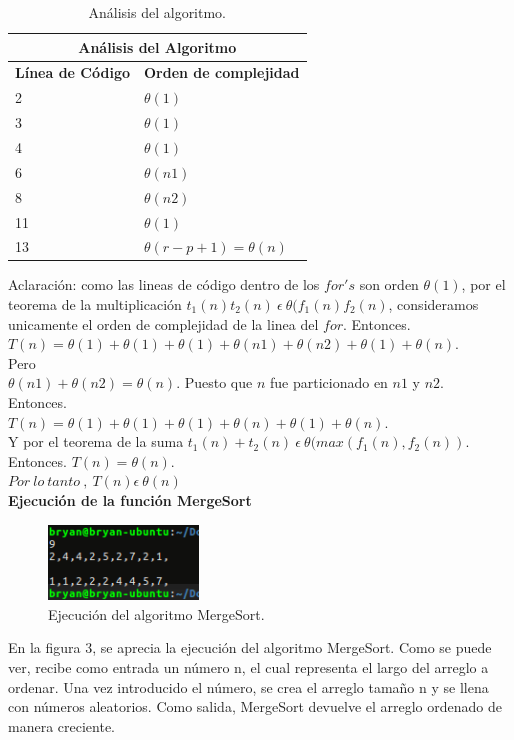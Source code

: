 \documentclass[12pt]{report}
\begin{document}
\begin{table}[htbp]
	\begin{center}
		\begin{tabular}{|l|l|}
			\hline
			\multicolumn{2}{|c|}{Análisis del Algoritmo} \\ 
			\hline
			\textbf{Línea de Código} & \textbf{Orden de complejidad}\\
			\hline
			2 & $\theta (1)$ \\ \hline
			3 & $\theta (1)$ \\ \hline
			4 & $\theta (1)$ \\ \hline
			6 & $\theta (n1)$ \\ \hline
			8 & $\theta (n2)$ \\ \hline
			11 & $\theta (1)$ \\ \hline
			13 & $\theta (r-p+1)= \theta (n)$ \\ \hline
		\end{tabular}
		\caption{Análisis del algoritmo.}
		\label{tabla:analisis1}
	\end{center}
\end{table}
Aclaración: como las lineas de código dentro de los $for's$ son orden $\theta (1)$, por el teorema de la multiplicación $t_{1}(n)t_{2}(n) \ \epsilon \ \theta (f_{1}(n)f_{2}(n)$, consideramos unicamente el orden de complejidad de la linea del $for$.\newpage
Entonces.\\
$T(n)=\theta (1) + \theta (1) + \theta (1) +\theta (n1) + \theta (n2) + \theta (1) + \theta (n).$\\
Pero\\
$\theta (n1) + \theta (n2) = \theta (n).$ Puesto que $n$ fue particionado en $n1$ y $n2$.\\
Entonces.\\
$T(n)=\theta (1) + \theta (1) + \theta (1) +\theta (n) + \theta (1) + \theta (n).$\\
Y por el teorema de la suma $t_{1}(n)+t_{2}(n) \ \epsilon \ \theta (max(f_{1}(n),f_{2}(n))$.
Entonces.
$T(n)=\theta (n).$\\

$Por \ lo \ tanto \ , \ T(n) \epsilon \ \theta (n)$\\


\textbf{Ejecución de la función MergeSort\\}
\begin{figure}[H]
	\includegraphics[width=4cm]{imagenes/2.png}
	\centering
	\caption{Ejecución del algoritmo MergeSort.}
	\centering
\end{figure}
En la figura 3, se aprecia la ejecución del algoritmo MergeSort. Como se puede ver, recibe como entrada un número n, el cual representa el largo del arreglo a ordenar. Una vez introducido el número, se crea el arreglo tamaño n y se llena con números aleatorios. Como salida, MergeSort devuelve el arreglo ordenado de manera creciente.\newpage
\end{document}
